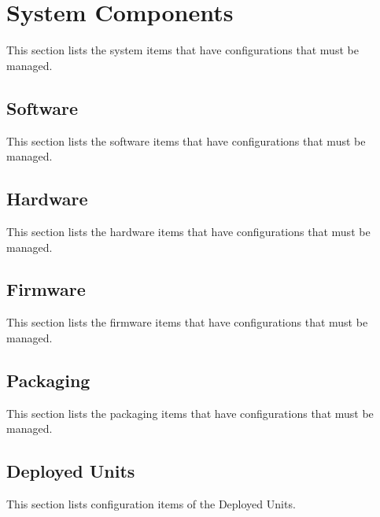 
\section{System Components}
\label{loc:CI_System}

This section lists the system items that have configurations that must be managed.

\subsection{Software}
\label{loc:CI_System_Software}

This section lists the software items that have configurations that must be managed.

\subsection{Hardware}
\label{loc:CI_System_Hardware}

This section lists the hardware items that have configurations that must be managed.

\subsection{Firmware}
\label{loc:CI_System_Firmware}

This section lists the firmware items that have configurations that must be managed.

\subsection{Packaging}
\label{loc:CI_System_Packaging}

This section lists the packaging items that have configurations that must be managed.

\subsection{Deployed Units}
\label{loc:CI_System_Deployed_Units}

This section lists configuration items of the Deployed Units.




